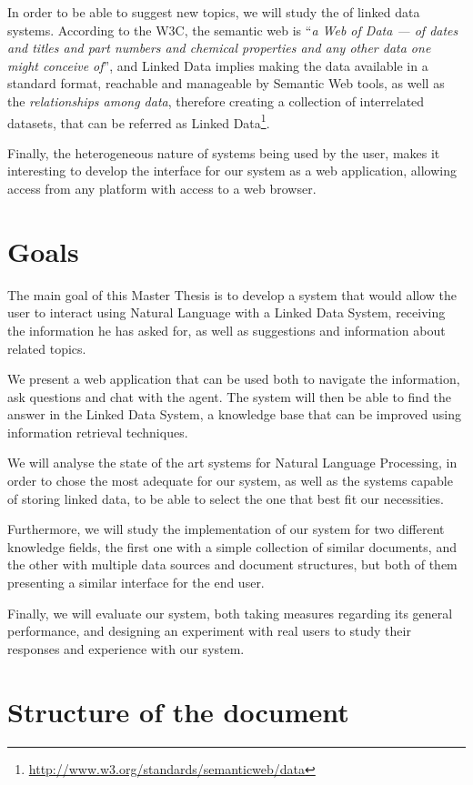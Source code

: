 In order to be able to suggest new topics, we will study the of linked data systems. According to the W3C, the semantic web is ``\emph{a Web of Data — of dates and titles and part numbers and chemical properties and any other data one might conceive of}'', and Linked Data implies making the data available in a standard format, reachable and manageable by Semantic Web tools, as well as the \emph{relationships among data}, therefore creating a collection of interrelated datasets, that can be referred as Linked Data\footnote{\url{http://www.w3.org/standards/semanticweb/data}}.

Finally, the heterogeneous nature of systems being used by the user, makes it interesting to develop the interface for our system as a web application, allowing access from any platform with access to a web browser.

\section{Goals}

The main goal of this Master Thesis is to develop a system that would allow the user to interact using Natural Language with a Linked Data System, receiving the information he has asked for, as well as suggestions and information about related topics.

We present a web application that can be used both to navigate the information, ask questions and chat with the agent. The system will then be able to find the answer in the Linked Data System, a knowledge base that can be improved using information retrieval techniques.

We will analyse the state of the art systems for Natural Language Processing, in order to chose the most adequate for our system, as well as the systems capable of storing linked data, to be able to select the one that best fit our necessities.

Furthermore, we will study the implementation of our system for two different knowledge fields, the first one with a simple collection of similar documents, and the other with multiple data sources and document structures, but both of them presenting a similar interface for the end user.

Finally, we will evaluate our system, both taking measures regarding its general performance, and designing an experiment with real users to study their responses and experience with our system.

\section{Structure of the document}

